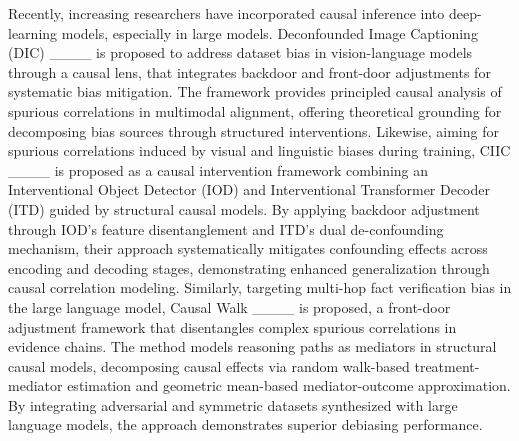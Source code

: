 Recently, increasing researchers have incorporated causal inference into deep-learning models, especially in large models. Deconfounded Image Captioning (DIC) ____ is proposed to address dataset bias in vision-language models through a causal lens, that integrates backdoor and front-door adjustments for systematic bias mitigation. The framework provides principled causal analysis of spurious correlations in multimodal alignment, offering theoretical grounding for decomposing bias sources through structured interventions. Likewise, aiming for spurious correlations induced by visual and linguistic biases during training, CIIC ____ is proposed as a causal intervention framework combining an Interventional Object Detector (IOD) and Interventional Transformer Decoder (ITD) guided by structural causal models. By applying backdoor adjustment through IOD's feature disentanglement and ITD's dual de-confounding mechanism, their approach systematically mitigates confounding effects across encoding and decoding stages, demonstrating enhanced generalization through causal correlation modeling. Similarly, targeting multi-hop fact verification bias in the large language model, Causal Walk ____ is proposed, a front-door adjustment framework that disentangles complex spurious correlations in evidence chains. 
The method models reasoning paths as mediators in structural causal models, decomposing causal effects via random walk-based treatment-mediator estimation and geometric mean-based mediator-outcome approximation. By integrating adversarial and symmetric datasets synthesized with large language models, the approach demonstrates superior debiasing performance. 

